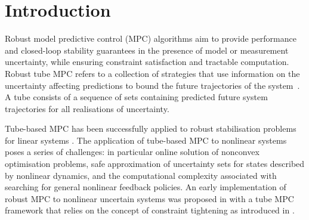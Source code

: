 \documentclass[a4paper, 10 pt, conference]{IEEEconf}
\begin{document}
\section{Introduction}
\noindent Robust model predictive control (MPC) algorithms aim to provide performance and closed-loop stability guarantees in the presence of model or measurement uncertainty, while ensuring constraint satisfaction and  tractable computation. 
%
Robust tube MPC refers to a collection of strategies that  
%
use information on the uncertainty affecting predictions to bound the future trajectories of the system~\cite{kouvaritakis,rawling}.
%
A tube consists of a sequence of sets containing predicted future system trajectories for all realisations of uncertainty. %
%

Tube-based MPC has been successfully applied to robust stabilisation problems for linear systems \cite{gossner1997stable, schuurmans2000robust, lee1999constrained, chisci2001systems, goulart, langson2004robust, rakovic2012homothetic, mayne2005robust}. %
%
The application of tube-based MPC to nonlinear systems poses a series of challenges: in particular online solution of nonconvex optimisation problems, safe approximation of uncertainty sets for states described by nonlinear dynamics, and the computational complexity associated with searching for  general nonlinear feedback policies. An early implementation of robust MPC to nonlinear uncertain systems was proposed in \cite{mayne2007tube} with a tube MPC framework that relies on the concept of constraint tightening as introduced in \cite{michalska1993robust}. %
\end{document}

